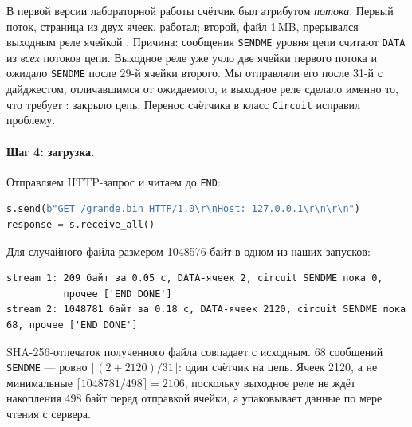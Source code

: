 \begin{attenzione}
В первой версии лабораторной работы счётчик был атрибутом \emph{потока}. Первый поток, страница из двух ячеек, работал; второй, файл 1\,MB, прерывался выходным реле ячейкой . Причина: сообщения \texttt{SENDME} уровня цепи считают \texttt{DATA} из \emph{всех} потоков цепи. Выходное реле уже учло две ячейки первого потока и ожидало \texttt{SENDME} после 29-й ячейки второго. Мы отправляли его после 31-й с дайджестом, отличавшимся от ожидаемого, и выходное реле сделало именно то, что требует : закрыло цепь. Перенос счётчика в класс \texttt{Circuit} исправил проблему.
\end{attenzione}

\paragraph{Шаг 4: загрузка.} Отправляем HTTP-запрос и читаем до \texttt{END}:
\begin{lstlisting}[language=Python]
s.send(b"GET /grande.bin HTTP/1.0\r\nHost: 127.0.0.1\r\n\r\n")
response = s.receive_all()
\end{lstlisting}
Для случайного файла размером \num{1048576} байт в одном из наших запусков:
\begin{lstlisting}[numbers=none]
stream 1: 209 байт за 0.05 с, DATA-ячеек 2, circuit SENDME пока 0,
          прочее ['END DONE']
stream 2: 1048781 байт за 0.18 с, DATA-ячеек 2120, circuit SENDME пока 68, прочее ['END DONE']
\end{lstlisting}
SHA-256-отпечаток полученного файла совпадает с исходным. 68 сообщений \texttt{SENDME} --- ровно $\lfloor (2 + 2120) / 31 \rfloor$: один счётчик на цепь. Ячеек 2120, а не минимальные $\lceil 1048781 / 498 \rceil = 2106$, поскольку выходное реле не ждёт накопления 498 байт перед отправкой ячейки, а упаковывает данные по мере чтения с сервера.

